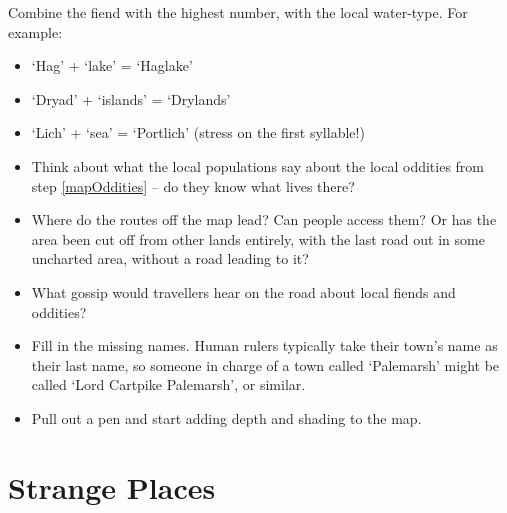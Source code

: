 \begin{multicols}{2}

Combine the fiend with the highest number, with the local water-type.
For example:

\begin{itemize}
\item
  `Hag' + `lake' = `Haglake'
\item
  `Dryad' + `islands' = `Drylands'
\item
  `Lich' + `sea' = `Portlich' (stress on the first syllable!)
\end{itemize}


\begin{itemize}
  \item
  Think about what the local populations say about the local oddities from step \ref{mapOddities} -- do they know what lives there?
  \item
  Where do the routes off the map lead?
  Can people access them?
  Or has the area been cut off from other lands entirely, with the last road out in some uncharted area, without a road leading to it?
  \item
  What gossip would travellers hear on the road about local fiends and oddities?
  \item
  Fill in the missing names.
  Human rulers typically take their town's name as their last name, so someone in charge of a town called `Palemarsh' might be called  `Lord Cartpike Palemarsh', or similar.
  \item
  Pull out a pen and start adding depth and shading to the map.
\end{itemize}

\end{multicols}

\section{Strange Places}

